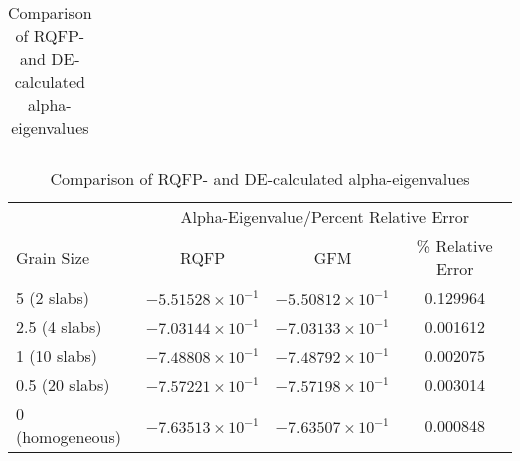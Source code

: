 \begin{table}[!htbp]
\begin{subtable}[!htbp]{1.0\textwidth}
\begin{tabular}{@{}lccc@{}}
	\bottomrule
	\end{tabular}
	\caption{Comparison of RQFP- and GFM-calculated alpha-eigenvalues}
	\label{AlphaGFM}
	\end{subtable}%
	\vspace{0.25cm}
	\begin{subtable}[!htbp]{1.0\textwidth}
	\centering{}
	\begin{tabular}{@{}lccc@{}}\toprule
	& \multicolumn{3}{c}{Alpha-Eigenvalue/Percent Relative Error} \\
	\cmidrule{2-4} Grain Size & RQFP & GFM & \% Relative Error \\
	\midrule
	5 (2 slabs) & $-5.51528 \times 10^{-1}$ & $-5.50812 \times 10^{-1}$ & 0.129964 \\ 
	2.5 (4 slabs) & $-7.03144 \times 10^{-1}$ & $-7.03133 \times 10^{-1}$ & 0.001612 \\ 
	1 (10 slabs) & $-7.48808 \times 10^{-1}$ & $-7.48792 \times 10^{-1}$ & 0.002075 \\ 
	0.5 (20 slabs) & $-7.57221 \times 10^{-1}$ & $-7.57198 \times 10^{-1}$ & 0.003014 \\ 
	0 (homogeneous) & $-7.63513 \times 10^{-1}$ & $-7.63507 \times 10^{-1}$ & 0.000848 \\ 
	\bottomrule
	\end{tabular}
	\caption{Comparison of RQFP- and DE-calculated alpha-eigenvalues}
	\label{AlphaDE}
	\end{subtable}
\end{table}

